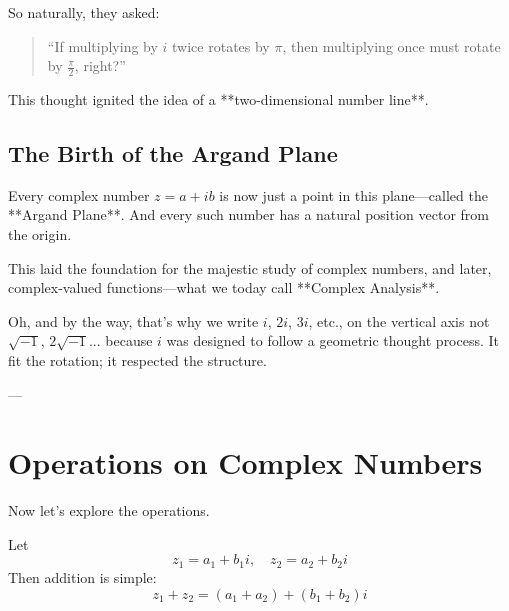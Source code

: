 So naturally, they asked:

\begin{quote}
“If multiplying by $i$ twice rotates by $\pi$, then multiplying once must rotate by $\frac{\pi}{2}$, right?”
\end{quote}

This thought ignited the idea of a **two-dimensional number line**.

\subsection*{The Birth of the Argand Plane}

\begin{center}
\end{center}

Every complex number $z = a + ib$ is now just a point in this plane—called the **Argand Plane**. And every such number has a natural position vector from the origin.

This laid the foundation for the majestic study of complex numbers, and later, complex-valued functions—what we today call **Complex Analysis**.

Oh, and by the way, that’s why we write $i$, $2i$, $3i$, etc., on the vertical axis not $\sqrt{-1}$, $2\sqrt{-1}$... because $i$ was designed to follow a geometric thought process. It fit the rotation; it respected the structure.

---

\section{Operations on Complex Numbers}

Now let’s explore the operations.

Let
\[
z_1 = a_1 + b_1 i, \quad z_2 = a_2 + b_2 i
\]
Then addition is simple:
\[
z_1 + z_2 = (a_1 + a_2) + (b_1 + b_2)i
\]

